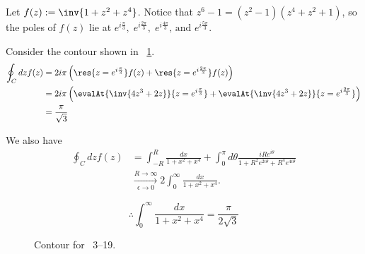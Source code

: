 \item

Let $f(z) := \inv{1 + z^2 + z^4}$.
Notice that $z^6 - 1 = \left( z^2 - 1 \right) \left( z^4 + z^2 + 1 \right)$,
so the poles of $f(z)$ lie at
$e^{i\frac{\pi}{3}},\; e^{i\frac{2\pi}{3}},\; e^{i\frac{4\pi}{3}} \text{, and } e^{i\frac{5\pi}{3}}$.

Consider the contour shown in ~\ref{fig:problem3-19}.
\begin{align*}
	\oint_C dz f(z)
	&= 2i\pi \left( \res{z=e^{i\frac{\pi}{3}}} f(z) + \res{z=e^{i\frac{2\pi}{3}}} f(z) \right) \\
	&= 2i\pi \left( \evalAt{\inv{4z^3 + 2z}}{z=e^{i\frac{\pi}{3}}} + \evalAt{\inv{4z^3 + 2z}}{z=e^{i\frac{2\pi}{3}}} \right) \\
	&= \frac{\pi}{\sqrt{3}}
\end{align*}

We also have
\begin{align*}
    \oint_C dz f(z)
    &= \int_{-R}^R \frac{dx}{1 + x^2 + x^4}
     + \int_0^\pi d\theta \frac{iRe^{i\theta}}{1 + R^2 e^{2i\theta} + R^4 e^{4i\theta}} \\
    &\xrightarrow[\epsilon \rightarrow 0]{R \rightarrow \infty}
     2\int_0^\infty \frac{dx}{1 + x^2 + x^4}.
\end{align*}

\[
    \therefore \int_0^\infty \frac{dx}{1 + x^2 + x^4} = \frac{\pi}{2\sqrt{3}}
\]

\begin{figure}
	\centering
	\caption{Contour for ~3--19.}%
	\label{fig:problem3-19}
\end{figure}